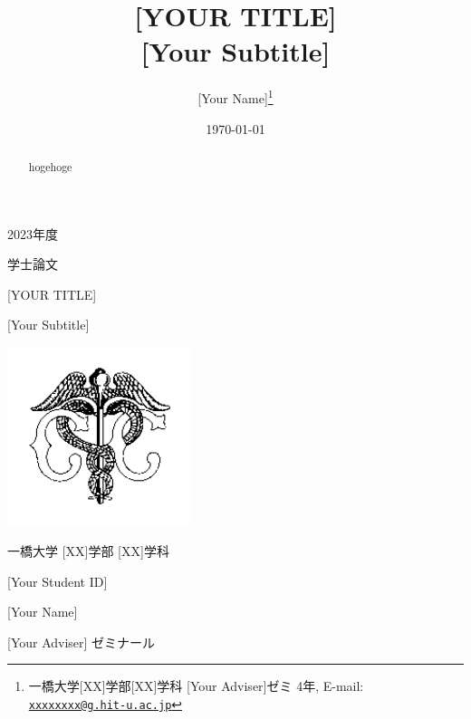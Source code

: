 \documentclass[a4paper, 12pt]{ltjsarticle}
\title{[YOUR TITLE]\\
  \large{[Your Subtitle]}}
\author{[Your Name]\thanks{一橋大学[XX]学部[XX]学科 [Your Adviser]ゼミ 4年, E-mail: \href{mailto:xxxxxxxx@g.hit-u.ac.jp}{\nolinkurl{xxxxxxxx@g.hit-u.ac.jp}}}}
\date{\today}
\begin{document}
\begin{titlepage}
  \begin{center}

      {\Large 2023年度}

      \vspace*{10truept}

      {\Large 学士論文}

      \vspace*{50truept}

      {\LARGE [YOUR TITLE]}

      \vspace{10truept}

      {\large [Your Subtitle]} 

      \vspace{30truept}

      \includegraphics[width=0.4\textwidth]{input/mercury.png}

      \vspace{30truept}

      {\Large 一橋大学 [XX]学部 [XX]学科}

      \vspace{10truept}

      {\Large [Your Student ID]}

      \vspace{10truept}

      {\Large [Your Name]}
      
      \vspace{30truept}

      {\Large [Your Adviser] ゼミナール}

  \end{center}
\end{titlepage}

\tableofcontents

\newpage
\maketitle
\begin{abstract}
  hogehoge
\end{abstract}
\end{document}
